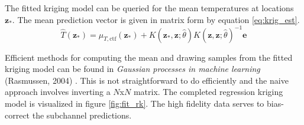 
The fitted kriging model can be queried for the mean temperatures at locations $\mathbf z_*$.  The mean prediction vector is given in matrix form by equation \ref{eq:krig_est}.
\begin{equation}
\hat T(\mathbf z_*) = \mu_{T,\mathrm{ctf}}(\mathbf z_*) + K(\mathbf z_*, \mathbf z;\hat \theta) K(\mathbf z, \mathbf z; \hat \theta)^{-1} \mathbf e
\label{eq:krig_est}
\end{equation}

Efficient methods for computing the mean and drawing samples from the fitted kriging model can be found in \emph{Gaussian processes in machine learning} (Rasmussen, 2004) \cite{rasmussen2004gaussian}.  This is not straightforward to do efficiently and the naive approach involves inverting a $N$x$N$ matrix.  The completed regression kriging model is visualized in figure \ref{fig:fit_rk}.  The high fidelity data serves to bias-correct the subchannel predictions.



